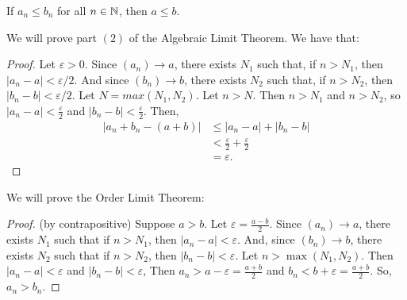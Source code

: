 \begin{theorem}
If $a_n \leq b_n$ for all $n\in \mathbb{N}$, then $a\leq b$.
\end{theorem}

We will prove part $(2)$ of the Algebraic Limit Theorem. We have that:

\begin{proof}
Let $\varepsilon > 0$. Since $(a_n) \to a$, there exists $N_1$ such that, if $n > N_1$, then $|a_n - a| < \varepsilon /2$. And since $(b_n) \to b$, there exists $N_2$ such that, if $n > N_2$, then $|b_n - b| < \varepsilon /2$. Let $N=max(N_1,N_2)$. Let $n>N$. Then $n>N_1$ and $n>N_2$, so $|a_n-a|<\frac{\varepsilon}{2}$ and $|b_n-b|<\frac{\varepsilon}{2}$.
Then,
\begin{align*}
    |a_n + b_n - (a+b)| &\le |a_n - a| + |b_n - b| \\
    &< \frac \varepsilon 2 + \frac \varepsilon 2 \\
    &= \varepsilon.
\end{align*}
\end{proof}

We will prove the Order Limit Theorem:
\begin{proof}(by contrapositive)
Suppose $a>b$. Let $\varepsilon = \frac{a-b}{2}$. Since $(a_n)\to a$, there exists $N_1$ such that if $n>N_1$, then $|a_n-a|<\varepsilon$. And, since $(b_n)\to b$, there exists $N_2$ such that if $n>N_2$, then $|b_n-b|<\varepsilon$. Let $n > \max(N_1, N_2)$. Then $|a_n - a| < \varepsilon$ and $|b_n - b| < \varepsilon$, Then $a_n > a - \varepsilon = \frac{a+b}2$ and $b_n < b + \varepsilon = \frac{a+b}2$. So, $a_n > b_n$.
\end{proof}